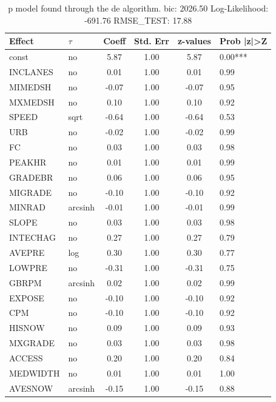 \begin{table}
	\caption{p model found through the de algorithm. bic: 2026.50 Log-Likelihood: -691.76 RMSE_TEST: 17.88}
	\begin{center}
		\begin{tabular}{|l|l|c|c|c|l|}
			\hline
			Effect & $\tau$ & Coeff & Std. Err & z-values & Prob |z|>Z \\
			\hline
			const & no & 5.87 & 1.00 & 5.87 & 0.00*** \\
			\hline
			INCLANES & no & 0.01 & 1.00 & 0.01 & 0.99 \\
			\hline
			MIMEDSH & no & -0.07 & 1.00 & -0.07 & 0.95 \\
			\hline
			MXMEDSH & no & 0.10 & 1.00 & 0.10 & 0.92 \\
			\hline
			SPEED & sqrt & -0.64 & 1.00 & -0.64 & 0.53 \\
			\hline
			URB & no & -0.02 & 1.00 & -0.02 & 0.99 \\
			\hline
			FC & no & 0.03 & 1.00 & 0.03 & 0.98 \\
			\hline
			PEAKHR & no & 0.01 & 1.00 & 0.01 & 0.99 \\
			\hline
			GRADEBR & no & 0.06 & 1.00 & 0.06 & 0.95 \\
			\hline
			MIGRADE & no & -0.10 & 1.00 & -0.10 & 0.92 \\
			\hline
			MINRAD & arcsinh & -0.01 & 1.00 & -0.01 & 0.99 \\
			\hline
			SLOPE & no & 0.03 & 1.00 & 0.03 & 0.98 \\
			\hline
			INTECHAG & no & 0.27 & 1.00 & 0.27 & 0.79 \\
			\hline
			AVEPRE & log & 0.30 & 1.00 & 0.30 & 0.77 \\
			\hline
			LOWPRE & no & -0.31 & 1.00 & -0.31 & 0.75 \\
			\hline
			GBRPM & arcsinh & 0.02 & 1.00 & 0.02 & 0.99 \\
			\hline
			EXPOSE & no & -0.10 & 1.00 & -0.10 & 0.92 \\
			\hline
			CPM & no & -0.10 & 1.00 & -0.10 & 0.92 \\
			\hline
			HISNOW & no & 0.09 & 1.00 & 0.09 & 0.93 \\
			\hline
			MXGRADE & no & 0.03 & 1.00 & 0.03 & 0.98 \\
			\hline
			ACCESS & no & 0.20 & 1.00 & 0.20 & 0.84 \\
			\hline
			MEDWIDTH & no & 0.01 & 1.00 & 0.01 & 1.00 \\
			\hline
			AVESNOW & arcsinh & -0.15 & 1.00 & -0.15 & 0.88 \\

\end{tabular}
\end{center}
\end{table}
